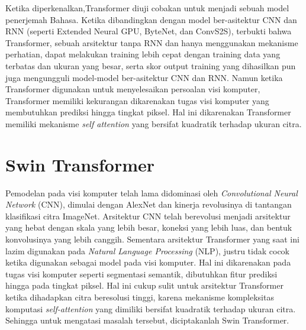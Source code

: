 Ketika diperkenalkan,Transformer diuji cobakan untuk menjadi sebuah model penerjemah Bahasa. Ketika dibandingkan dengan model ber-asitektur CNN dan RNN 
(seperti Extended Neural GPU, ByteNet, dan ConvS2S), terbukti bahwa Transformer, sebuah arsitektur tanpa RNN dan hanya menggunakan mekanisme perhatian, dapat 
melakukan training lebih cepat dengan training data yang terbatas dan ukuran yang besar, serta skor output training yang dihasilkan pun juga mengungguli model-model 
ber-asitektur CNN dan RNN. Namun ketika Transformer digunakan untuk menyelesaikan persoalan visi komputer, Transformer memiliki kekurangan dikarenakan 
tugas visi komputer yang membutuhkan prediksi hingga tingkat piksel. Hal ini dikarenakan Transformer memiliki mekanisme \emph{self attention} yang bersifat 
kuadratik terhadap ukuran citra. \parencite{Vaswani2017}

\section{Swin Transformer}
\label{sec:swintransformer}

Pemodelan pada visi komputer telah lama didominasi oleh \emph{Convolutional Neural Network} (CNN), dimulai dengan AlexNet dan kinerja revolusinya di tantangan 
klasifikasi citra \linebreak ImageNet. Arsitektur CNN telah berevolusi menjadi arsitektur yang hebat dengan skala yang lebih besar, koneksi yang lebih luas, dan bentuk 
konvolusinya yang lebih canggih. Sementara arsitektur Transformer yang saat ini lazim digunakan pada \emph{Natural Language Processing} (NLP), justru tidak cocok 
ketika digunakan sebagai model pada visi komputer. Hal ini dikarenakan pada tugas visi komputer seperti segmentasi semantik, dibutuhkan fitur prediksi hingga pada 
tingkat piksel. Hal ini cukup sulit untuk arsitektur Transformer ketika dihadapkan citra beresolusi tinggi, karena mekanisme kompleksitas komputasi \emph{self-attention} 
yang dimiliki bersifat kuadratik terhadap ukuran citra. Sehingga untuk mengatasi masalah tersebut, diciptakanlah Swin Transformer. \parencite{Liu2021}

